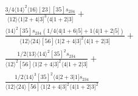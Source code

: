\documentclass[varwidth, border=5pt]{standalone}
\begin{document}
\begin{my}
$\begin{gathered}
\scriptscriptstyle\frac{3/4⟨14⟩^2⟨16⟩[23][35]s_{234}}{⟨12⟩⟨1|2+4|3]^3⟨4|1+2|3]}+\\
\scriptscriptstyle\frac{⟨14⟩^2[35]s_{234}(1/4⟨4|1+6|5]+1⟨4|1+2|5])}{⟨12⟩⟨24⟩[56]⟨1|2+4|3]^2⟨4|1+2|3]}+\\
\scriptscriptstyle\frac{1/2⟨13⟩⟨14⟩^2[35]^2s_{234}}{⟨12⟩^2[56]⟨1|2+4|3]^2⟨4|1+2|3]}+\\
\scriptscriptstyle\frac{1/2⟨14⟩^3[35]^2⟨4|2+3|1]s_{234}}{⟨12⟩⟨24⟩[56]⟨1|2+4|3]^2⟨4|1+2|3]^2}\phantom{+}
\end{gathered}$
\end{my}
\end{document}
